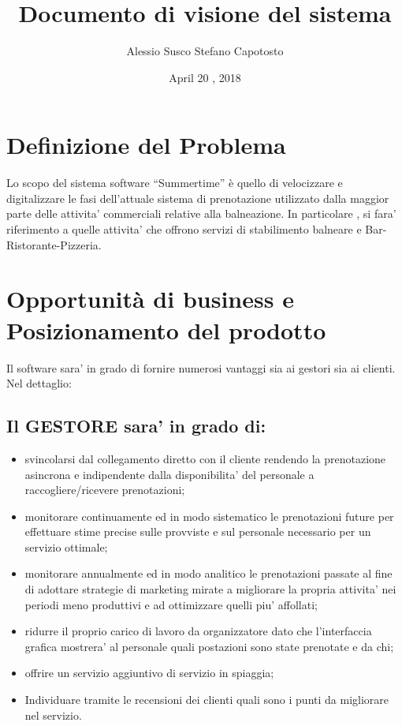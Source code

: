 \documentclass[a4paper]{article}
\begin{document}
\title{Documento di visione del sistema}
\date{April 20 , 2018}
\maketitle
\author{Alessio Susco \hspace*{6cm} Stefano Capotosto}

\tableofcontents

\clearpage

\section{Definizione del Problema}
Lo scopo del sistema software “Summertime” è quello di velocizzare e digitalizzare le fasi dell’attuale sistema di prenotazione utilizzato dalla maggior parte delle attivita’ commerciali relative alla balneazione. In particolare , si fara’ riferimento a quelle attivita’ che offrono servizi di stabilimento balneare e Bar-Ristorante-Pizzeria.



\section{Opportunità di business e Posizionamento del prodotto}
Il software sara’ in grado di fornire numerosi vantaggi sia ai gestori sia ai clienti.
Nel dettaglio:

\subsection{Il GESTORE sara’ in grado di:}

\begin{itemize}
\item svincolarsi dal collegamento diretto con il cliente rendendo la prenotazione asincrona e indipendente dalla disponibilita’ del personale a raccogliere/ricevere prenotazioni;
\item monitorare continuamente ed in modo sistematico le prenotazioni future per effettuare stime precise sulle provviste e sul personale necessario per un servizio ottimale;
\item monitorare annualmente ed in modo analitico le prenotazioni passate al fine di adottare strategie di marketing mirate a migliorare la propria attivita’ nei periodi meno produttivi e ad ottimizzare quelli piu’ affollati;
\item ridurre il proprio carico di lavoro da organizzatore dato che l’interfaccia grafica mostrera’ al personale quali postazioni sono state prenotate e da chi;
\item offrire un servizio aggiuntivo di servizio in spiaggia;
\item Individuare tramite le recensioni dei clienti quali sono i punti da migliorare nel servizio.
\end{itemize}
\end{document}
